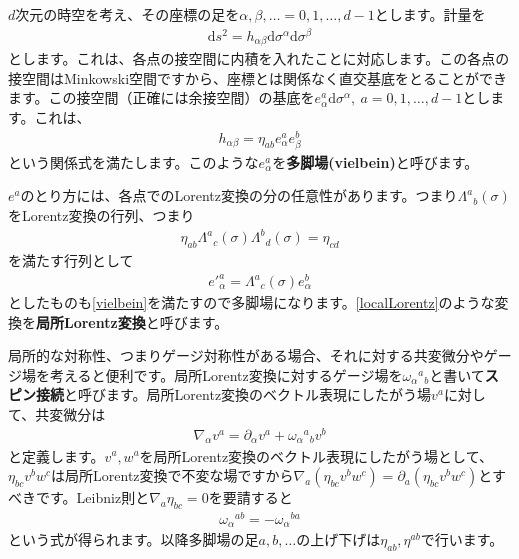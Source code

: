 \documentclass[report,paper=a4, fontsize=12pt, line_length=16cm, number_of_lines=33,dvipdfmx]{jlreq}
\numberwithin{equation}{chapter}
\numberwithin{equation}{section}
\newcommand{\del}{\partial}
\newcommand{\kyou}[1]{{\sffamily \bfseries #1}}
\newcommand{\di}{\mathrm{d}}
\begin{document}
$d$次元の時空を考え、その座標の足を$\alpha,\beta,\dots=0,1,\dots,d-1$とします。計量を
\begin{align}
  \di s^2 = h_{\alpha\beta} \di \sigma^{\alpha}\di \sigma^{\beta}
\end{align}
とします。これは、各点の接空間に内積を入れたことに対応します。この各点の接空間はMinkowski空間ですから、座標とは関係なく直交基底をとることができます。この接空間（正確には余接空間）の基底を$e^{a}_{\alpha}\di \sigma^{\alpha}, \ a=0,1,\dots,d-1$とします。これは、
\begin{align}
  h_{\alpha\beta}=\eta_{ab}e^{a}_{\alpha}e^{b}_{\beta}\label{vielbein}
\end{align}
という関係式を満たします。このような$e^{a}_{\alpha}$を\kyou{多脚場(vielbein)}と呼びます。

$e^{a}$のとり方には、各点でのLorentz変換の分の任意性があります。つまり$\Lambda^{a}{}_{b}(\sigma)$をLorentz変換の行列、つまり
\begin{align}
  \eta_{ab}\Lambda^{a}{}_{c}(\sigma)\Lambda^{b}{}_{d}(\sigma)=\eta_{cd}
\end{align}
を満たす行列として
\begin{align}
  e'^{a}_{\alpha}=\Lambda^{a}{}_{c}(\sigma)e^{b}_{\alpha}
  \label{localLorentz}
\end{align}
としたものも\eqref{vielbein}を満たすので多脚場になります。\eqref{localLorentz}のような変換を\kyou{局所Lorentz変換}と呼びます。

局所的な対称性、つまりゲージ対称性がある場合、それに対する共変微分やゲージ場を考えると便利です。局所Lorentz変換に対するゲージ場を$\omega_{\alpha}{}^{a}{}_{b}$と書いて\kyou{スピン接続}と呼びます。局所Lorentz変換のベクトル表現にしたがう場$v^{a}$に対して、共変微分は
\begin{align}
  \nabla_{\alpha}v^{a}=\del_{\alpha}v^{a}+\omega_{\alpha}{}^{a}{}_{b}v^{b}
\end{align}
と定義します。$v^{a},w^{a}$を局所Lorentz変換のベクトル表現にしたがう場として、$\eta_{bc}v^{b}w^{c}$は局所Lorentz変換で不変な場ですから$\nabla_{a}(\eta_{bc}v^{b}w^{c})=\del_{a}(\eta_{bc}v^{b}w^{c})$とすべきです。Leibniz則と$\nabla_{a}\eta_{bc}=0$を要請すると
\begin{align}
  \omega_{\alpha}{}^{ab}
  =-\omega_{\alpha}{}^{ba}
\end{align}
という式が得られます。以降多脚場の足$a,b,\dots$の上げ下げは$\eta_{ab},\eta^{ab}$で行います。
\end{document}
